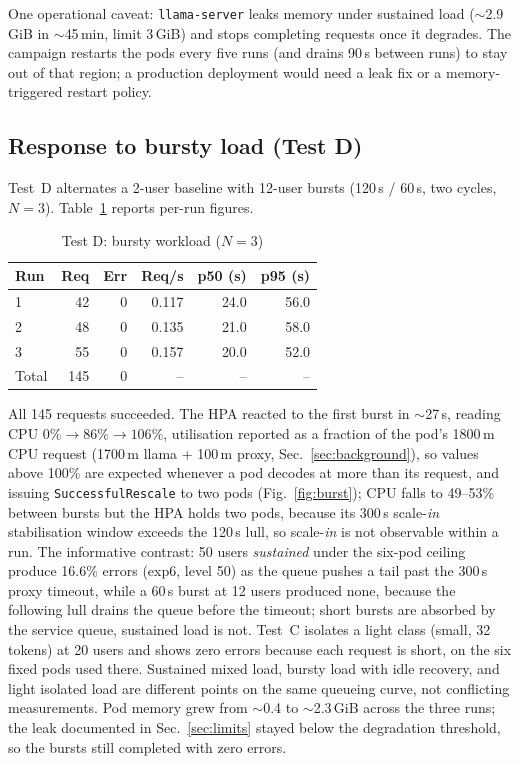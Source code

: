 \documentclass[conference]{IEEEtran}
\newcommand{\code}[1]{\texttt{#1}}
\begin{document}
One operational caveat: \code{llama-server} leaks memory under sustained load
($\sim$2.9\,GiB in $\sim$45\,min, limit 3\,GiB) and stops completing requests once it
degrades. The campaign restarts the pods every five runs (and drains 90\,s
between runs) to stay out of that region; a production deployment would need a
leak fix or a memory-triggered restart policy.

\subsection{Response to bursty load (Test D)}
\label{sec:burst}

Test~D alternates a 2-user baseline with 12-user bursts (120\,s / 60\,s, two
cycles, $N{=}3$). Table~\ref{tab:burst} reports per-run figures.

\begin{table}[t]
\caption{Test D: bursty workload ($N{=}3$)}
\label{tab:burst}
\centering\small
\begin{tabular}{@{}lrrrrr@{}}
\toprule
Run & Req & Err & Req/s & p50 (s) & p95 (s) \\
\midrule
1 & 42 & 0 & 0.117 & 24.0 & 56.0 \\
2 & 48 & 0 & 0.135 & 21.0 & 58.0 \\
3 & 55 & 0 & 0.157 & 20.0 & 52.0 \\
\midrule
Total & 145 & 0 & -- & -- & -- \\
\bottomrule
\end{tabular}
\end{table}

All 145 requests succeeded. The HPA reacted to the first burst in $\sim$27\,s,
reading CPU $0\%{\to}86\%{\to}106\%$, utilisation reported as a
fraction of the pod's 1800\,m CPU request (1700\,m llama + 100\,m proxy,
Sec.~\ref{sec:background}), so values above 100\% are expected whenever a pod
decodes at more than its request, and issuing \code{SuccessfulRescale} to
two pods (Fig.~\ref{fig:burst}); CPU falls to 49--53\% between bursts but the
HPA holds two pods, because its 300\,s scale-\emph{in} stabilisation window
exceeds the 120\,s lull, so scale-\emph{in} is not observable within a run.
The informative contrast: 50 users \emph{sustained} under the six-pod ceiling
produce 16.6\% errors (exp6, level 50) as the queue pushes a tail past the
300\,s proxy timeout, while a 60\,s burst at 12 users produced none, because
the following lull drains the queue before the timeout; short bursts are
absorbed by the service queue, sustained load is not. Test~C isolates a
light class (small, 32 tokens) at 20 users and shows zero errors because
each request is short, on the six fixed pods used there. Sustained mixed
load, bursty load with idle recovery, and light isolated load are different
points on the same queueing curve, not conflicting measurements. Pod memory
grew from $\sim$0.4 to $\sim$2.3\,GiB across the three runs; the leak documented in
Sec.~\ref{sec:limits} stayed below the degradation threshold, so the bursts
still completed with zero errors.
\end{document}
